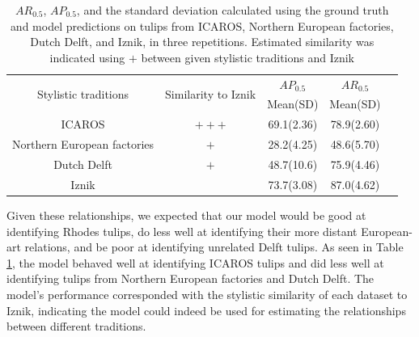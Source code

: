 \documentclass[11pt]{article}
\begin{document}
\begin{table}[H]
\caption{$AR_{0.5}$, $AP_{0.5}$, and the standard deviation calculated using the ground truth and model predictions on tulips from ICAROS, Northern European factories, Dutch Delft, and Iznik, in three repetitions. Estimated similarity was indicated using $+$ between given stylistic traditions and Iznik}
\centering
\begin{tabular}{ccccc} 
\hline
\multirow{2}{*}{Stylistic  traditions} & \multirow{2}{*}{Similarity to Iznik} & $AP_{0.5}$ & $AR_{0.5}$ \\ 
& & Mean(SD) & Mean(SD) \\ 
\hline
ICAROS & $+++$ & 69.1(2.36) & 78.9(2.60)\\ 
Northern European factories & $+$ & 28.2(4.25) & 48.6(5.70)\\ 
Dutch Delft & $+$ & 48.7(10.6) & 75.9(4.46)\\ 
Iznik &  & 73.7(3.08) &  87.0(4.62) \\ 
\hline
\end{tabular}
\label{tab:similaritytest}
\end{table}
Given these relationships, we expected that our model would be good at identifying Rhodes tulips, do less well at identifying their more distant European-art relations, and be poor at identifying unrelated Delft tulips. As seen in Table \ref{tab:similaritytest}, the model behaved well at identifying ICAROS tulips and did less well at identifying tulips from Northern European factories and Dutch Delft. The model's performance corresponded with the stylistic similarity of each dataset to Iznik, indicating the model could indeed be used for estimating the relationships between different traditions.\par
\end{document}
